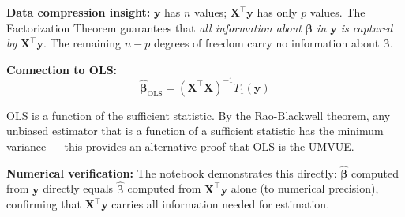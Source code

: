 \documentclass[12pt,a4paper]{article}
\begin{document}
\textbf{Data compression insight:} $\mathbf{y}$ has $n$ values; $\mathbf{X}^\top\mathbf{y}$ has only
$p$ values. The Factorization Theorem guarantees that \emph{all information about
$\boldsymbol{\beta}$ in $\mathbf{y}$ is captured by} $\mathbf{X}^\top\mathbf{y}$. The remaining
$n - p$ degrees of freedom carry no information about $\boldsymbol{\beta}$.

\textbf{Connection to OLS:}
\begin{equation}
    \hat{\boldsymbol{\beta}}_{\mathrm{OLS}} = (\mathbf{X}^\top\mathbf{X})^{-1}T_1(\mathbf{y})
\end{equation}

OLS is a function of the sufficient statistic. By the Rao-Blackwell theorem,
any unbiased estimator that is a function of a sufficient statistic has the
minimum variance --- this provides an alternative proof that OLS is the UMVUE.

\textbf{Numerical verification:} The notebook demonstrates this directly:
$\hat{\boldsymbol{\beta}}$ computed from $\mathbf{y}$ directly equals $\hat{\boldsymbol{\beta}}$
computed from $\mathbf{X}^\top\mathbf{y}$ alone (to numerical precision), confirming
that $\mathbf{X}^\top\mathbf{y}$ carries all information needed for estimation.

\end{document}
